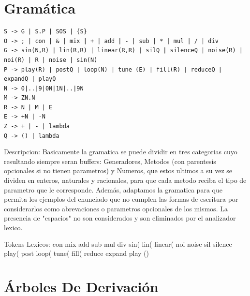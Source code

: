 \documentclass[a4paper,titlepage,10pt]{article}
\begin{document}

\maketitle

\section{Gramática}

\begin{verbatim}
S -> G | S.P | SOS | {S}
O -> ; | con | & | mix | + | add | - | sub | * | mul | / | div
G -> sin(N,R) | lin(R,R) | linear(R,R) | silQ | silenceQ | noise(R) | noi(R) | R | noise | sin(N)
P -> play(R) | postQ | loop(N) | tune (E) | fill(R) | reduceQ | expandQ | playQ
N -> 0|..|9|0N|1N|..|9N
M -> ZN.N
R -> N | M | E
E -> +N | -N 
Z -> + | - | lambda
Q -> () | lambda

\end{verbatim}

Descripcion:
Basicamente la gramatica se puede dividir en tres categorias cuyo resultando siempre seran buffers: Generadores, Metodos (con parentesis opcionales si no tienen parametros) y Numeros, que estos ultimos a su vez se dividen en enteros, naturales y racionales, para que cada metodo reciba el tipo de parametro que le corresponde. Además, adaptamos la gramatica para que permita los ejemplos del enunciado que no cumplen las formas de escritura por considerarlos como abrevaciones o parametros opcionales de los mismos. 
La presencia de "espacios" no son considerados y son eliminados por el analizador lexico.

Tokens Lexicos:
con
mix
add
sub
mul
div
sin(
lin(
linear(
noi
noise
sil
silence
play(
post
loop(
tune(
fill(
reduce
expand
play
()

\section{Árboles De Derivación}
\end{document}
